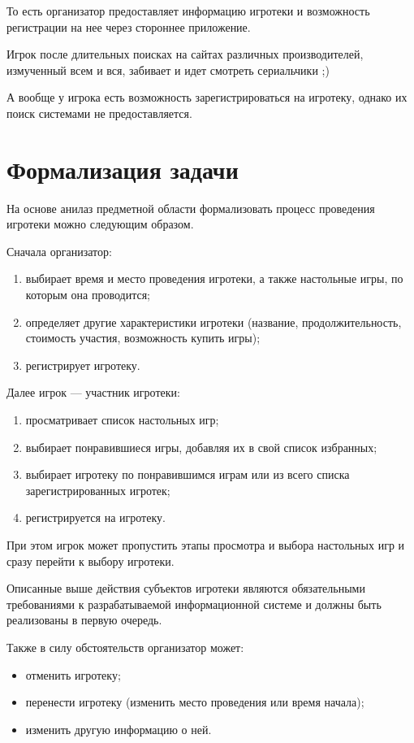 То есть организатор предоставляет информацию игротеки и возможность регистрации
на нее через стороннее приложение.

Игрок после длительных поисках на сайтах различных производителей, измученный
всем и вся, забивает и идет смотреть сериальчики ;)

А вообще у игрока есть возможность зарегистрироваться на игротеку, однако их
поиск системами не предоставляется.

\section{Формализация задачи}

На основе анилаз предметной области формализовать процесс проведения игротеки
можно следующим образом.

Сначала организатор:
\begin{enumerate}[label=\arabic*)]
    \item выбирает время и место проведения игротеки, а также настольные игры,
      по которым она проводится;
    \item определяет другие характеристики игротеки (название,
        продолжительность, стоимость участия, возможность купить игры);
    \item регистрирует игротеку.
\end{enumerate}

Далее игрок --- участник игротеки:
\begin{enumerate}[label=\arabic*)]
    \item просматривает список настольных игр;
    \item выбирает понравившиеся игры, добавляя их в свой список избранных;
    \item выбирает игротеку по понравившимся играм или из всего списка
        зарегистрированных игротек;
    \item регистрируется на игротеку.
\end{enumerate}

При этом игрок может пропустить этапы просмотра и выбора настольных игр и
сразу перейти к выбору игротеки.

Описанные выше действия субъектов игротеки являются обязательными требованиями
к разрабатываемой информационной системе и должны быть реализованы в первую
очередь.

Также в силу обстоятельств организатор может:
\begin{itemize}
    \item отменить игротеку;
    \item перенести игротеку (изменить место проведения или время начала);
    \item изменить другую информацию о ней.
\end{itemize}

